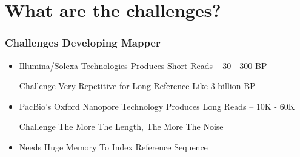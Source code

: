 \section{What are the challenges?}

\begin{frame}
	\frametitle{Challenges Developing Mapper}
	
	\begin{itemize}
		\item<1-> Illumina/Solexa Technologies Produces Short Reads -- 30 - 300 BP
		\pause[1]
		\begin{alertblock}{Challenge}
			Very Repetitive for Long Reference Like 3 billion BP
		\end{alertblock}
		\item<2-> PacBio's Oxford Nanopore Technology Produces Long Reads -- 10K - 60K
		\pause[2]
		\begin{alertblock}{Challenge}
			The More The Length, The More The Noise
		\end{alertblock}
		\item<3-> Needs Huge Memory To Index Reference Sequence
	\end{itemize}
\end{frame}